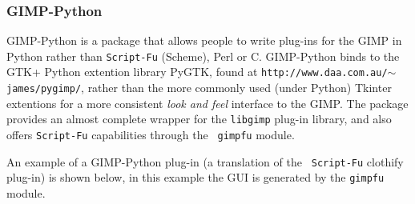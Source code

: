 \documentclass[twoside,11pt]{article}
\newcommand{\htmladdnormallink}[2]{#1}
\newcommand{\latex}[1]{#1}
\begin{document}
\subsubsection{GIMP-Python}

\htmladdnormallink{GIMP-Python}{http://www.daa.com.au/~james/pygimp/}
is a package that allows people to write plug-ins for the GIMP in
Python rather than {\tt Script-Fu} (Scheme), Perl or C. GIMP-Python
binds to the \htmladdnormallink{GTK+}{http://www.gtk.org} Python
extention library
\htmladdnormallink{PyGTK}{http://www.daa.com.au/~james/pygtk/}\latex{,
found at {\tt http://www.daa.com.au/$\sim$james/pygimp/},} rather than
the more commonly used (under Python) Tkinter extentions for a more
consistent {\em look and feel} interface to the GIMP. The package
provides an almost complete wrapper for the {\tt libgimp} plug-in
library, and also offers {\tt Script-Fu} capabilities through the {\tt
gimpfu} module.

An example of a GIMP-Python plug-in (a translation of the {\tt
Script-Fu} clothify plug-in) is shown below, in this example the GUI
is generated by the {\tt gimpfu} module.
\end{document}
